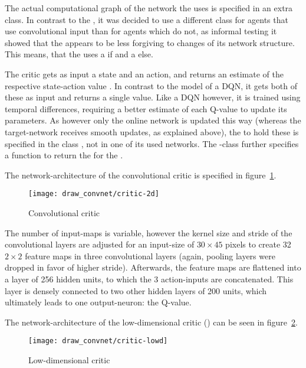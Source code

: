 The actual computational graph of the network the  uses is specified in an extra class. In contrast to the , it was decided to use a different class for agents that use convolutional input than for agents which do not, as informal testing it showed that the  appears to be less forgiving to changes of its network structure. This means, that the  uses a  if  and a  else.

The critic gets as input a state and an action, and returns an estimate of the respective state-action value . In contrast to the model of a DQN, it gets both of these as input and returns a single value. Like a DQN however, it is trained using temporal differences, requiring a better estimate of each Q-value to update its parameters. As however only the online network is updated this way (whereas the target-network receives smooth updates, as explained above), the  to hold these is specified in the class , not in one of its used networks. The -class further specifies a function to return the  for the .

The network-architecture of the convolutional critic is specified in figure~\ref{fig:2dcrit}. 

\begin{figure}[h]
	\centering 
	\texttt{[image: draw\_convnet/critic-2d]}
	\caption{Convolutional critic}
	\label{fig:2dcrit}
\end{figure}

The number of input-maps is variable, however the kernel size and stride of the convolutional layers are adjusted for an input-size of $30\times45$ pixels to create 32 $2\times2$ feature maps in three convolutional layers (again, pooling layers were dropped in favor of higher stride).  Afterwards, the feature maps are flattened into a layer of 256 hidden units, to which the 3 action-inputs are concatenated. This layer is densely connected to two other hidden layers of 200 units, which ultimately leads to one output-neuron: the Q-value.

The network-architecture of the low-dimensional critic () can be seen in figure~\ref{fig:lowdcrit}.

\begin{figure}[h]
	\centering 
	\texttt{[image: draw\_convnet/critic-lowd]}
	\caption{Low-dimensional critic}
	\label{fig:lowdcrit}
\end{figure}

